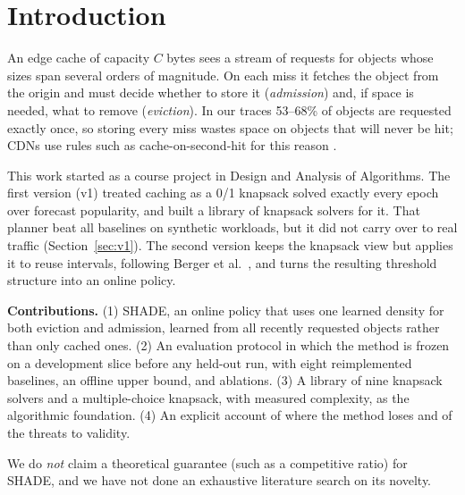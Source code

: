 \documentclass[conference]{IEEEtran}
\begin{document}
\section{Introduction}
An edge cache of capacity $C$ bytes sees a stream of requests for objects whose sizes span several orders of
magnitude. On each miss it fetches the object from the origin and must decide whether to store it
(\emph{admission}) and, if space is needed, what to remove (\emph{eviction}). In our traces 53--68\% of objects
are requested exactly once, so storing every miss wastes space on objects that will never be hit; CDNs use rules such as cache-on-second-hit for this reason \cite{akamai}.

This work started as a course project in Design and Analysis of Algorithms. The first version (v1) treated caching
as a 0/1 knapsack solved exactly every epoch over forecast popularity, and built a library of knapsack solvers for
it. That planner beat all baselines on synthetic workloads, but it did not carry over to real traffic
(Section~\ref{sec:v1}). The second version keeps the knapsack view but applies it to reuse intervals, following
Berger et al.~\cite{pfoo}, and turns the resulting threshold structure into an online policy.

\textbf{Contributions.} (1) SHADE, an online policy that uses one learned density for both eviction and admission,
learned from all recently requested objects rather than only cached ones. (2) An evaluation protocol in which the
method is frozen on a development slice before any held-out run, with eight reimplemented baselines, an offline
upper bound, and ablations. (3) A library of nine knapsack solvers and a multiple-choice knapsack, with measured
complexity, as the algorithmic foundation. (4) An explicit account of where the method loses and of the threats to
validity.

We do \emph{not} claim a theoretical guarantee (such as a competitive ratio) for SHADE, and we have not done an
exhaustive literature search on its novelty.

\end{document}
